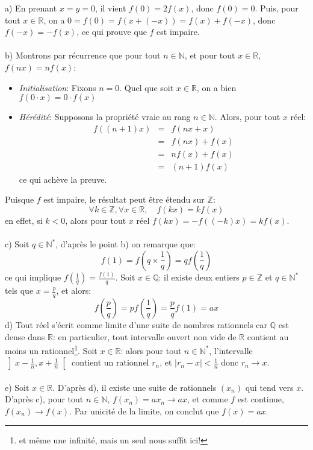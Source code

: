 a) En prenant $x=y=0$, il vient $f(0)=2f(x)$, donc $f(0)=0$. Puis, pour tout $x\in\mathbb{R}$, on a $0=f(0)=f(x+(-x))=f(x)+f(-x)$, donc $f(-x)=-f(x)$, ce qui prouve que $f$ est impaire.\\ \\
b) Montrons par récurrence que pour tout $n\in\mathbb{N}$, et pour tout $x\in\mathbb{R}$, $f(nx)=nf(x)$:
\begin{itemize}
  \item \textit{Initialisation}: Fixons $n=0$. Quel que soit $x\in\mathbb{R}$, on a bien $f(0\cdot x)=0\cdot f(x)$
  \item \textit{Hérédité}: Supposons la propriété vraie au rang $n\in\mathbb{N}$. Alors, pour tout $x$ réel:
  \begin{eqnarray*}
    f((n+1)x) &=& f(nx+x) \\
    &=& f(nx) + f(x) \\
    &=& nf(x)+f(x) \\
    &=& (n+1)f(x)
  \end{eqnarray*}
  ce qui achève la preuve.
\end{itemize}
Puisque $f$ est impaire, le résultat peut être étendu sur $\mathbb{Z}$: 
\[ \forall k\in\mathbb{Z}, \forall x \in \mathbb{R}, \quad f(kx)=kf(x) \]
en effet, si $k<0$, alors pour tout $x$ réel $f(kx)=-f((-k)x)=kf(x)$.\\ \\
c) Soit $q\in\mathbb{N}^*$, d’après le point b) on remarque que: 
  \[ f\left( 1 \right) = f\left( q \times \frac{1}{q} \right) = qf\left(\frac{1}{q}\right) \]
ce qui implique $f\left(\frac{1}{q}\right) = \frac{f(1)}{q}$. Soit $x\in\mathbb{Q}$: il existe deux entiers $p\in\mathbb{Z}$ et $q\in\mathbb{N}^*$ tels que $x=\frac{p}{q}$, et alors:
\[
f\left(\frac{p}{q}\right) = pf\left(\frac{1}{q}\right) = \frac{p}{q}f(1) = ax
\]
d) Tout réel s’écrit comme limite d'une suite de nombres rationnels car $\mathbb{Q}$ est dense dans $\mathbb{R}$: en particulier, tout intervalle ouvert non vide de $\mathbb{R}$ contient au moins un rationnel\footnote{et même une infinité, mais un seul nous suffit ici!}. Soit $x\in\mathbb{R}$: alors pour tout $n\in\mathbb{N}^*$, l'intervalle $\left]x-\frac{1}{n}, x+\frac{1}{n}\right[$ contient un rationnel $r_n$, et $|r_n-x| < \frac{1}{n}$ donc $r_n\to x$.\\ \\
e) Soit $x\in\mathbb{R}$. D’après d), il existe une suite de rationnels $(x_n)$ qui tend vers $x$. D’après c), pour tout $n\in\mathbb{N}$, $f(x_n)=ax_n\to ax$, et comme $f$ est continue, $f(x_n)\to f(x)$. Par unicité de la limite, on conclut que $f(x)=ax$.
